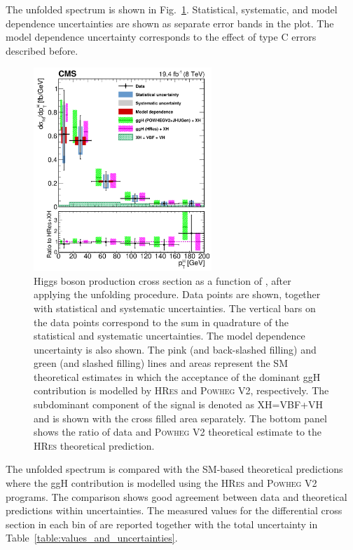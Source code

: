 The unfolded \pth spectrum is shown in Fig.~\ref{fig:unfolded}. Statistical, systematic, and model dependence uncertainties are shown as separate error bands in the plot. The model dependence uncertainty corresponds to the effect of type C errors described before.
\begin{figure}[!htb]
\centering
\includegraphics[width=0.6\textwidth]{images/unblinding/pthRatio_unfolded_paper.pdf}
\caption{Higgs boson production cross section as a function of \pth{}, after applying the unfolding procedure.
Data points are shown, together with statistical and systematic uncertainties. The vertical bars on the data points correspond to the sum in quadrature of the statistical and systematic uncertainties. The model dependence uncertainty is also shown.
The pink (and back-slashed filling) and green (and slashed filling) lines and areas represent the SM theoretical estimates in which the acceptance of the dominant ggH contribution is modelled by \textsc{HRes} and \textsc{Powheg V2}, respectively. The subdominant component of the signal is denoted as XH=VBF+VH and is shown with the cross filled area separately. The bottom panel shows the ratio of data and \textsc{Powheg V2} theoretical estimate to the \textsc{HRes} theoretical prediction.}\label{fig:unfolded}
\end{figure}

The unfolded spectrum is compared with the SM-based theoretical predictions where the ggH contribution is modelled using the \textsc{HRes} and \textsc{Powheg V2} programs. The comparison shows good agreement between data and theoretical predictions within uncertainties.
The measured values for the differential cross section in each bin of \pth are reported together with the total uncertainty in Table~\ref{table:values_and_uncertainties}.

